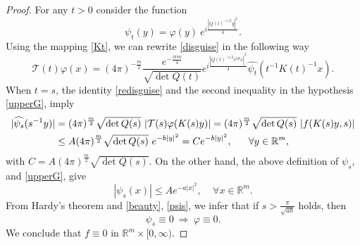 \documentclass[11pt,a4paper]{amsart}
\def \phi {\varphi}
\def \vf{\varphi}
\newcommand{\Rm}{\mathbb R^m}
\numberwithin{equation}{section}
\numberwithin{equation}{section}
\begin{document}
\begin{proof}
For any $t>0$ consider the function 
\[
\psi_t(y) = \vf(y)\ e^{i \frac{|Q(t)^{-1/2} y|^2}{4}}.
\] 
Using the mapping \eqref{Kt}, we can rewrite \eqref{disguise} in the following way 
\begin{equation}\label{redisguise}
\mathcal T(t) \vf(x) = (4\pi
)^{-\frac{m}{2}}  \frac{e^{-\frac{i \pi m}4}}{\sqrt{\det Q(t)}} e^{i \frac{|Q(t)^{-1/2} e^{tB} x|^2}{4}}\widehat{\psi_t}(t^{-1} K(t)^{-1} x).
\end{equation}
When $t = s$, the identity \eqref{redisguise} and the second inequality in the hypothesis \eqref{upperG}, imply
\begin{align}\label{beauty}
|\widehat{\psi_s}(s^{-1} y)| & =  (4\pi
)^{\frac{m}{2}} \sqrt{\det Q(s)}\ |\mathcal T(s) \vf(K(s) y)| = (4\pi
)^{\frac{m}{2}} \sqrt{\det Q(s)}\ |f(K(s) y,s)|
\\
& \le A  (4\pi
)^{\frac{m}{2}} \sqrt{\det Q(s)}\ e^{- b |y|^2} = C e^{-b |y|^2},\ \ \ \ \ \forall y\in \Rm,
\notag
\end{align}
with $C = A  (4\pi
)^{\frac{m}{2}} \sqrt{\det Q(s)}$. On the other hand, the above definition of $\psi_s$, and \eqref{upperG}, give
\begin{equation}\label{psis}
|\psi_s(x)| \le A e^{- a |x|^2},\ \ \ \ \ \forall x\in \Rm. 
\end{equation}
From Hardy's theorem and \eqref{beauty}, \eqref{psis}, we infer that if $s > \frac{\pi}{\sqrt{ab}}$ holds, then
\[
\psi_s \equiv 0\ \Longrightarrow\ \phi \equiv 0.
\]
We conclude that $f\equiv 0$ in $\Rm\times [0,\infty)$. 
 
\end{proof}

  


\end{document}
